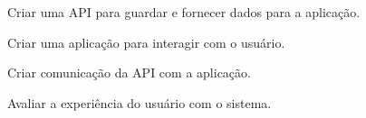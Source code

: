 \begin{itemsize}\itemEntender Criar uma API para guardar e fornecer dados para a aplicação.
\end{itemsize}

\begin{itemsize}\itemEntender Criar uma aplicação para interagir com o usuário.
\end{itemsize}

\begin{itemsize}\itemEntender Criar comunicação da API com a aplicação.
\end{itemsize}

\begin{itemsize}\itemEntender Avaliar a experiência do usuário com o sistema.
\end{itemsize}